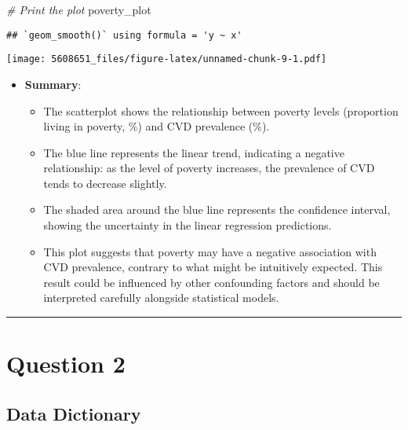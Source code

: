 \documentclass[
]{article}
\newenvironment{Shaded}{\begin{snugshade}}{\end{snugshade}}
\newcommand{\CommentTok}[1]{\textcolor[rgb]{0.56,0.35,0.01}{\textit{#1}}}
\newcommand{\NormalTok}[1]{#1}
\providecommand{\tightlist}{%
  \setlength{\itemsep}{0pt}\setlength{\parskip}{0pt}}
\begin{document}
\begin{Shaded}
\begin{Highlighting}[]
\CommentTok{\# Print the plot}
\NormalTok{poverty\_plot}
\end{Highlighting}
\end{Shaded}

\begin{verbatim}
## `geom_smooth()` using formula = 'y ~ x'
\end{verbatim}

\texttt{[image: 5608651\_files/figure-latex/unnamed-chunk-9-1.pdf]}

\begin{itemize}
\tightlist
\item
  \textbf{Summary}:

  \begin{itemize}
  \tightlist
  \item
    The scatterplot shows the relationship between poverty levels
    (proportion living in poverty, \%) and CVD prevalence (\%).
  \item
    The blue line represents the linear trend, indicating a negative
    relationship: as the level of poverty increases, the prevalence of
    CVD tends to decrease slightly.
  \item
    The shaded area around the blue line represents the confidence
    interval, showing the uncertainty in the linear regression
    predictions.
  \item
    This plot suggests that poverty may have a negative association with
    CVD prevalence, contrary to what might be intuitively expected. This
    result could be influenced by other confounding factors and should
    be interpreted carefully alongside statistical models.
  \end{itemize}
\end{itemize}

\begin{center}\rule{0.5\linewidth}{0.5pt}\end{center}

\section{Question 2}\label{question-2}

\subsection{Data Dictionary}\label{data-dictionary-1}
\end{document}
